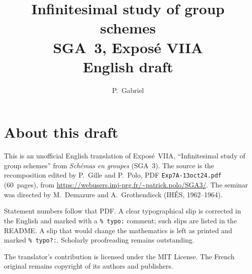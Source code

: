 \documentclass[11pt,a4paper,oneside]{amsbook}
\title[SGA~3, Expos\'e VIIA (English draft)]{Infinitesimal study of group schemes\\
{\normalsize SGA~3, Expos\'e VIIA\\English draft}}
\author{P.\ Gabriel}
\date{}
\begin{document}
\frontmatter
\maketitle

\chapter*{About this draft}
This is an unofficial English translation of Expos\'e~VIIA, ``Infinitesimal study of group schemes''
from \textit{Sch\'emas en groupes} (SGA~3).
The source is the recomposition edited by P.~Gille and P.~Polo,
PDF \texttt{Exp7A-13oct24.pdf} (60~pages),
from \url{https://webusers.imj-prg.fr/~patrick.polo/SGA3/}.
The seminar was directed by M.~Demazure and A.~Grothendieck
(IH\'ES, 1962--1964).

Statement numbers follow that PDF. A clear typographical slip is
corrected in the English and marked with a \texttt{\% typo:} comment;
such slips are listed in the README. A slip that would change the
mathematics is left as printed and marked \texttt{\% typo?:}.
Scholarly proofreading remains outstanding.

The translator's contribution is licensed under the MIT License.
The French original remains copyright of its authors and publishers.

\tableofcontents
\mainmatter










\end{document}
